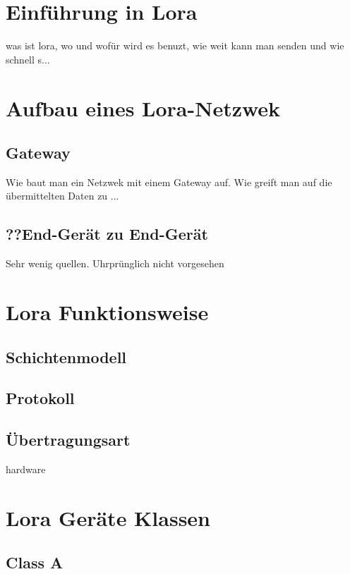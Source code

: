 \documentclass[a4paper,12pt]{article}
\begin{document}
    \tableofcontents
    \newpage
    \begin{abstract} 
       \cite{WhatIsLoRa}
       \cite{Semtech}
    \end{abstract}

    \section{Einführung in Lora}
        \cite{WhatIsLoRa}
        \cite{LoraLimit}
    was ist lora, wo und wofür wird es benuzt, wie weit kann man senden und wie schnell s...
    \section{Aufbau eines Lora-Netzwek}
    \subsection{Gateway}
        \cite{Loriot}
        \cite{TheThing}
        \cite{WhatIsLoRa}
        \cite{LoRaSpec}
        \cite{RFC8376}
    Wie baut man ein Netzwek mit einem Gateway auf. Wie greift man auf die übermittelten Daten zu ...
    \subsection{??End-Gerät zu End-Gerät}
    Sehr wenig quellen. Uhrprünglich nicht vorgesehen
    \section{Lora Funktionsweise}
        \cite{RFC8376}
        \cite{LoRaSpec}
    \subsection{Schichtenmodell}
    \subsection{Protokoll}
    \subsection{Übertragungsart}
    hardware
    \section{Lora Geräte Klassen}
        \cite{RFC8376}
        \cite{LoraClasses}
    \subsection{Class A}
\end{document}
